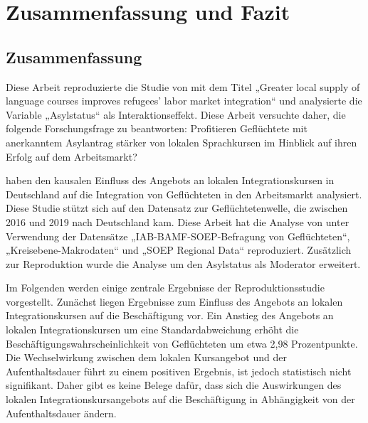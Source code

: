 \chapter{Zusammenfassung und Fazit}
\label{cha:fazit}


\section{Zusammenfassung}
\label{sec:zusammenfassung}


Diese Arbeit reproduzierte die Studie von \textcite{Kanas:2023} mit dem Titel „Greater local supply of language courses improves refugees’ labor market integration“ und analysierte die Variable „Asylstatus“ als Interaktionseffekt. Diese Arbeit versuchte daher, die folgende Forschungsfrage zu beantworten: Profitieren Geflüchtete mit anerkanntem Asylantrag stärker von lokalen Sprachkursen im Hinblick auf ihren Erfolg auf dem Arbeitsmarkt?

 \textcite{Kanas:2023} haben den kausalen Einfluss des Angebots an lokalen Integrationskursen in Deutschland auf die Integration von Geflüchteten in den Arbeitsmarkt analysiert. Diese Studie stützt sich auf den Datensatz zur Geflüchtetenwelle, die zwischen 2016 und 2019 nach Deutschland kam. Diese Arbeit hat die Analyse von \textcite{Kanas:2023} unter Verwendung der Datensätze „IAB-BAMF-SOEP-Befragung von Geflüchteten“, „Kreisebene-Makrodaten“ und „SOEP Regional Data“ reproduziert. Zusätzlich zur Reproduktion wurde die Analyse um den Asylstatus als Moderator erweitert.
 
 Im Folgenden werden einige zentrale Ergebnisse der Reproduktionsstudie vorgestellt. Zunächst liegen Ergebnisse zum Einfluss des Angebots an lokalen Integrationskursen auf die Beschäftigung vor. Ein Anstieg des Angebots an lokalen Integrationskursen um eine Standardabweichung erhöht die Beschäftigungswahrscheinlichkeit von Geflüchteten um etwa 2,98 Prozentpunkte. Die Wechselwirkung zwischen dem lokalen Kursangebot und der Aufenthaltsdauer führt zu einem positiven Ergebnis, ist jedoch statistisch nicht signifikant. Daher gibt es keine Belege dafür, dass sich die Auswirkungen des lokalen Integrationskursangebots auf die Beschäftigung in Abhängigkeit von der Aufenthaltsdauer ändern.
 
